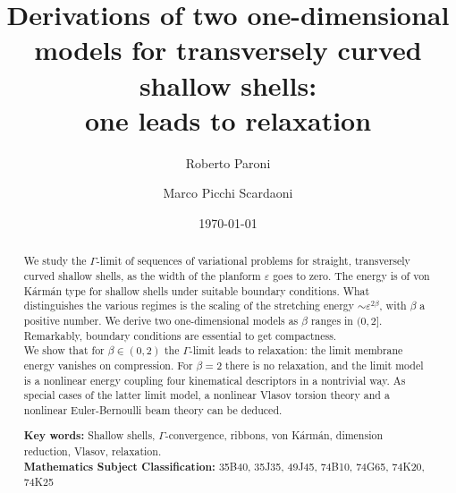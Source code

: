 \documentclass[a4, 11pt, reqno, final]{amsart}
\newcommand\e{\varepsilon}
\theoremstyle{plain}%
\begin{document}
	\sloppy

	\title[Two one-dimensional models for transversely curved shallow shells]{Derivations of two one-dimensional models for transversely curved shallow shells: \\ one leads to relaxation}

	\author[R. Paroni]{Roberto Paroni}
	\address[R. Paroni]{Department of Civil and Industrial Engineering, University of Pisa, Largo Lucio Lazzarino 1, 56122, Pisa, Italy}

	\author[M. Picchi Scardaoni]{Marco Picchi Scardaoni}
	\address[M. Picchi Scardaoni]{Department of Civil and Industrial Engineering, University of Pisa, Largo Lucio Lazzarino 1, 56122, Pisa, Italy}

	\date{\today}

	\begin{abstract}
		We study the $\Gamma$-limit of sequences of variational problems for straight, transversely curved shallow shells, as the width of the planform $\e$ goes to zero.
		The energy is of von Kármán type for shallow shells under suitable boundary conditions. What distinguishes the various regimes is the scaling of the stretching energy $\sim \e^{2\beta}$, with $\beta$ a positive number. We derive two one-dimensional models as $\beta$ ranges in $(0, 2]$. Remarkably, boundary conditions are essential to get compactness. \\
		We show that for $\beta \in (0, 2)$ the $\Gamma$-limit leads to relaxation: the limit membrane energy vanishes on compression. For $\beta=2$ there is no relaxation, and the limit model is a nonlinear energy coupling four kinematical descriptors in a nontrivial way.
		As special cases of the latter limit model, a nonlinear Vlasov torsion theory and a nonlinear Euler-Bernoulli beam theory can be deduced.

		\textbf{Key words:} Shallow shells, $\Gamma$-convergence, ribbons, von Kármán, dimension reduction, Vlasov, relaxation.\\
		\textbf{Mathematics Subject Classification:} 		35B40, 35J35, 49J45, 74B10, 74G65, 74K20, 74K25
	\end{abstract}

	\maketitle

	\tableofcontents
\end{document}
